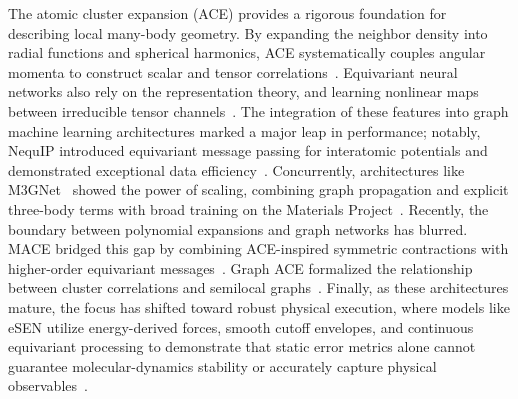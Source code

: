 \documentclass[aps,prx,preprint,notitlepage,superscriptaddress,nofootinbib,floatfix]{revtex4-2}
\begin{document}
The atomic cluster expansion (ACE) provides a rigorous foundation for describing local many-body geometry. By expanding the neighbor density into radial functions and spherical harmonics, ACE systematically couples angular momenta to construct scalar and tensor correlations~\cite{drautz2019}. Equivariant neural networks also rely on the representation theory, and learning nonlinear maps between irreducible tensor channels~\cite{geiger2022}. The integration of these features into graph machine learning architectures marked a major leap in performance; notably, NequIP introduced equivariant message passing for interatomic potentials and demonstrated exceptional data efficiency~\cite{batzner2022}. Concurrently, architectures like M3GNet~\cite{chen2022m3gnet} showed the power of scaling, combining graph propagation and explicit three-body terms with broad training on the Materials Project~\cite{riebesell2025matbench}. Recently, the boundary between polynomial expansions and graph networks has blurred. MACE bridged this gap by combining ACE-inspired symmetric contractions with higher-order equivariant messages~\cite{batatia2022}. Graph ACE formalized the relationship between cluster correlations and semilocal graphs~\cite{bochkarev2024}. Finally, as these architectures mature, the focus has shifted toward robust physical execution, where models like eSEN utilize energy-derived forces, smooth cutoff envelopes, and continuous equivariant processing to demonstrate that static error metrics alone cannot guarantee molecular-dynamics stability or accurately capture physical observables~\cite{fu2025esen}.

\end{document}
